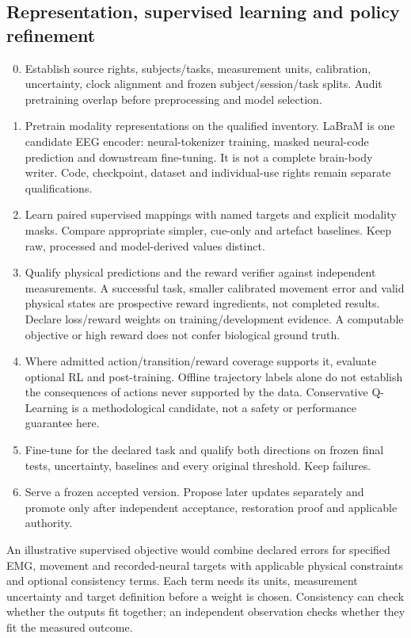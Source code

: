 \subsection{Representation, supervised learning and policy refinement}
\begin{enumerate}
\setcounter{enumi}{-1}
\item Establish source rights, subjects/tasks, measurement units, calibration,    uncertainty, clock alignment and frozen subject/session/task splits. Audit    pretraining overlap before preprocessing and model selection.
\item Pretrain modality representations on the qualified inventory. LaBraM is one    candidate EEG encoder: neural-tokenizer training, masked neural-code prediction    and downstream fine-tuning. It is not a complete brain-body writer. Code,    checkpoint, dataset and individual-use rights remain separate qualifications.
\item Learn paired supervised mappings with named targets and explicit modality    masks. Compare appropriate simpler, cue-only and artefact baselines. Keep raw,    processed and model-derived values distinct.
\item Qualify physical predictions and the reward verifier against independent    measurements. A successful task, smaller calibrated movement error and valid    physical states are prospective reward ingredients, not completed results.    Declare loss/reward weights on training/development evidence. A computable    objective or high reward does not confer biological ground truth.
\item Where admitted action/transition/reward coverage supports it, evaluate optional    RL and post-training. Offline trajectory labels alone do not establish the    consequences of actions never supported by the data. Conservative Q-Learning    is a methodological candidate, not a safety or performance guarantee here.
\item Fine-tune for the declared task and qualify both directions on frozen final    tests, uncertainty, baselines and every original threshold. Keep failures.
\item Serve a frozen accepted version. Propose later updates separately and promote    only after independent acceptance, restoration proof and applicable authority.
\end{enumerate}

An illustrative supervised objective would combine declared errors for
specified EMG, movement and recorded-neural targets with applicable physical
constraints and optional consistency terms. Each term needs its units,
measurement uncertainty and target definition before a weight is chosen.
Consistency can check whether the outputs fit together; an independent
observation checks whether they fit the measured outcome.

